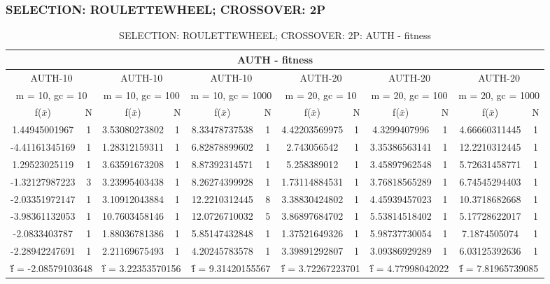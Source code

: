 \subsubsection{SELECTION: ROULETTEWHEEL; CROSSOVER: 2P}
\begin{table}[H]
	\centering
	\caption{SELECTION: ROULETTEWHEEL; CROSSOVER: 2P: AUTH - fitness}
	\begin{adjustbox}{width=1\textwidth}
		\begin{tabular}{ |c|c||c|c||c|c||c|c||c|c||c|c| }
			\hline
			\multicolumn{12}{|c|}{AUTH - fitness} \\
			\hline
			\multicolumn{2}{|c||}{AUTH-10} & \multicolumn{2}{c||}{AUTH-10} & \multicolumn{2}{c||}{AUTH-10} & \multicolumn{2}{c||}{AUTH-20} & \multicolumn{2}{c||}{AUTH-20} & \multicolumn{2}{c|}{AUTH-20}\\
			\hline
			\multicolumn{2}{|c||}{m = 10, gc = 10} & \multicolumn{2}{c||}{m = 10, gc = 100} & \multicolumn{2}{c||}{m = 10, gc = 1000} & \multicolumn{2}{c||}{m = 20, gc = 10} & \multicolumn{2}{c||}{m = 20, gc = 100} & \multicolumn{2}{c|}{m = 20, gc = 1000}\\
			\hline
			f($\bar{x}$) & N & f($\bar{x}$) & N & f($\bar{x}$) & N & f($\bar{x}$) & N & f($\bar{x}$) & N & f($\bar{x}$) & N\\
			\hline
			\hline
			1.44945001967 & 1 & 3.53080273802 & 1 & 8.33478737538 & 1 & 4.42203569975 & 1 & 4.3299407996 & 1 & 4.66660311445 & 1\\
			-4.41161345169 & 1 & 1.28312159311 & 1 & 6.82878899602 & 1 & 2.743056542 & 1 & 3.35386563141 & 1 & 12.2210312445 & 1\\
			1.29523025119 & 1 & 3.63591673208 & 1 & 8.87392314571 & 1 & 5.258389012 & 1 & 3.45897962548 & 1 & 5.72631458771 & 1\\
			-1.32127987223 & 3 & 3.23995403438 & 1 & 8.26274399928 & 1 & 1.73114884531 & 1 & 3.76818565289 & 1 & 6.74545294403 & 1\\
			-2.03351972147 & 1 & 3.10912043884 & 1 & 12.2210312445 & 8 & 3.38830424802 & 1 & 4.45939457023 & 1 & 10.3718682668 & 1\\
			-3.98361132053 & 1 & 10.7603458146 & 1 & 12.0726710032 & 5 & 3.86897684702 & 1 & 5.53814518402 & 1 & 5.17728622017 & 1\\
			-2.0833403787 & 1 & 1.88036781386 & 1 & 5.85147432848 & 1 & 1.37521649326 & 1 & 5.98737730054 & 1 & 7.1874505074 & 1\\
			-2.28942247691 & 1 & 2.21169675493 & 1 & 4.20245783578 & 1 & 3.39891292807 & 1 & 3.09386929289 & 1 & 6.03125392636 & 1\\
			\hline
			\multicolumn{2}{|c||}{\^{f} = -2.08579103648} & \multicolumn{2}{c||}{\^{f} = 3.22353570156} & \multicolumn{2}{c||}{\^{f} = 9.31420155567} & \multicolumn{2}{c||}{\^{f} = 3.72267223701} & \multicolumn{2}{c||}{\^{f} = 4.77998042022} & \multicolumn{2}{c|}{\^{f} = 7.81965739085}\\
			\hline
		\end{tabular}
	\end{adjustbox}
\end{table}
